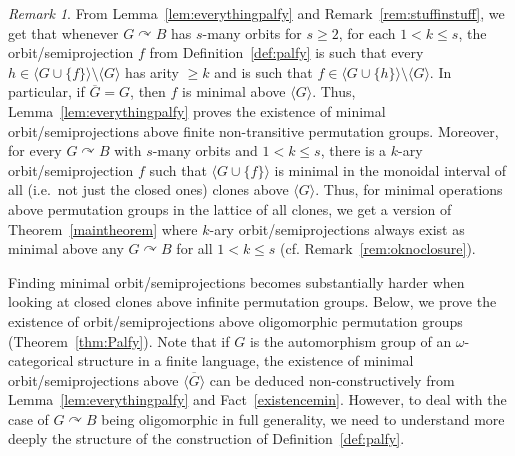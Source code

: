 \documentclass{article}
\newcommand{\remmic}[1]{\textcolor{orange}{TODO: #1}}
\newtheorem{corollary}[theorem]{Corollary}
\theoremstyle{remark}
\newtheorem{remark}[theorem]{Remark}
\theoremstyle{definition}
\def\acts{\curvearrowright}
\begin{document}

\begin{remark}\label{rem:minimalityalways}
{From Lemma~\ref{lem:everythingpalfy} and Remark~\ref{rem:stuffinstuff}, we get that whenever $G\acts B$ has $s$-many orbits for $s\geq 2$, for each $1< k\leq s$, the orbit\-/semiprojection $f$ from Definition~\ref{def:palfy} is such that every $h\in\langle G\cup\{f\}\rangle\setminus\langle G\rangle$ has arity $\geq k$ and is such that $f\in \langle G\cup\{h\}\rangle\setminus\langle G\rangle$. In particular, if $\overline{G}=G$, then $f$ is minimal above $\langle G\rangle$. Thus, Lemma~\ref{lem:everythingpalfy} proves the existence of minimal orbit\-/semiprojections above finite non-transitive permutation groups. Moreover, for every $G\acts B$ with $s$-many orbits and $1<k\leq s$, there is a $k$-ary orbit\-/semiprojection $f$ such that $\langle G\cup\{f\}\rangle$ is minimal in the monoidal interval of all (i.e.~not just the closed ones) clones above $\langle G\rangle$. Thus, for minimal operations above permutation groups in the lattice of all clones, we get a version of Theorem~\ref{maintheorem} where $k$-ary orbit\-/semiprojections always exist as minimal above any $G\acts B$ for all $1<k\leq s$ (cf. Remark~\ref{rem:oknoclosure}).}
\end{remark}



{Finding} minimal orbit\-/semiprojections becomes substantially harder when looking at closed clones above infinite permutation groups. Below, we prove the existence of orbit\-/semiprojections above oligomorphic permutation groups (Theorem~\ref{thm:Palfy}). Note that if $G$ is the automorphism group of an $\omega$-categorical structure in a finite language, the existence of minimal orbit\-/semiprojections above $\overline{\langle G\rangle}$ can be deduced non-constructively from Lemma~\ref{lem:everythingpalfy} and Fact~\ref{existencemin}. However, to deal with the case of $G\acts B$ being oligomorphic in full generality, we need to understand more deeply the structure of the construction of Definition~\ref{def:palfy}.\\
\end{document}
